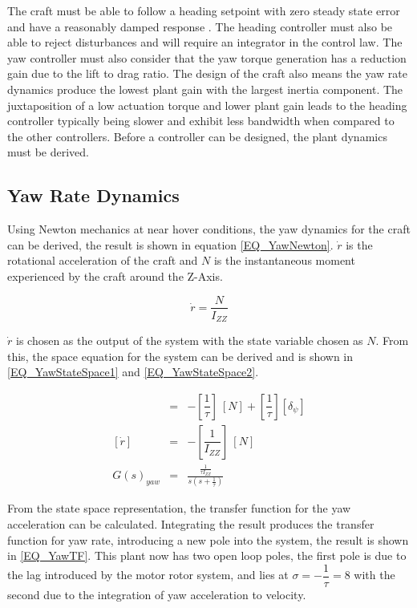 The craft must be able to follow a heading setpoint with zero steady state error and have a reasonably damped response . The heading controller must also be able to reject disturbances and will require an integrator in the control law. The yaw controller must also consider that the yaw torque generation has a reduction gain due to the lift to drag ratio. The design of the craft also means the yaw rate dynamics produce the lowest plant gain with the largest inertia component. The juxtaposition of a low actuation torque and lower plant gain leads to the heading controller typically being slower and exhibit less bandwidth when compared to the other controllers. Before a controller can be designed, the plant dynamics must be derived.
	
	\subsection{Yaw Rate Dynamics}
	Using Newton mechanics at near hover conditions, the yaw dynamics for the craft can be derived, the result is shown in equation \eqref{EQ_YawNewton}. $\dot{r}$ is the rotational acceleration of the craft and $N$ is the instantaneous moment experienced by the craft around the Z-Axis.
	
	\begin{equation}
	\label{EQ_YawNewton}
	\dot{r} = \dfrac{N}{I_{ZZ}}
	\end{equation}
	
	$\dot{r}$ is chosen as the output of the system with the state variable chosen as $N$. From this, the space equation for the system can be derived and is shown in \eqref{EQ_YawStateSpace1} and \eqref{EQ_YawStateSpace2}. 
	
	\begin{eqnarray}
	[\dot{N}] &=& - [\dfrac{1}{\tau}] \ [N] + [\dfrac{1}{\tau}] [\delta_\psi]\label{EQ_YawStateSpace1}\\\label{EQ_HeaveStateSpace22}
	[\dot{r}] &=& - [\dfrac{1}{I_{ZZ}}] \ [N]\label{EQ_YawStateSpace2}\\
	G(s)_{yaw} &=& \frac{\frac{1}{\tau I_{ZZ}}}{s (s + \frac{1}{\tau})}\label{EQ_YawTF}
	\end{eqnarray}
	
	From the state space representation, the transfer function for the yaw acceleration can be calculated. Integrating the result produces the transfer function for yaw rate, introducing a new pole into the system, the result is shown in \eqref{EQ_YawTF}. This plant now has two open loop poles, the first pole is due to the lag introduced by the motor rotor system, and lies at $\sigma = -\dfrac{1}{\tau} = 8$ with the second due to the integration of yaw acceleration to velocity. 
	
